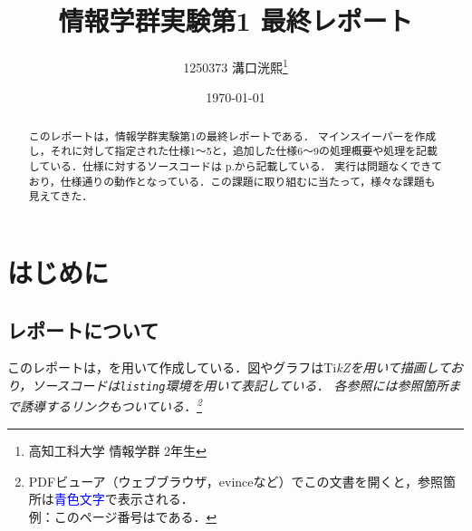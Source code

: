\documentclass[a4j,11pt]{jsarticle}
\title{\vspace{0cm}情報学群実験第1 最終レポート}
\author{1250373 溝口洸熙\thanks{高知工科大学 情報学群 2年生}}
\date{\today}
\begin{document}
\maketitle

\begin{abstract}
    このレポートは，情報学群実験第1の最終レポートである．
    マインスイーパーを作成し，それに対して指定された仕様1〜5と，追加した仕様6〜9の処理概要や処理を記載している．仕様に対するソースコードは p.\pageref{sec:ソースコード}から記載している．
    実行は問題なくできており，仕様通りの動作となっている．この課題に取り組むに当たって，様々な課題も見えてきた．
\end{abstract}
\newpage
\tableofcontents
\newpage
\section*{はじめに}\label{sec:はじめに}
\subsection*{レポートについて}
このレポートは，\LaTeXe を用いて作成している．図やグラフはTi\it{k}\normalfont Zを用いて描画しており，ソースコードは\verb|listing|環境を用いて表記している．
各参照には参照箇所まで誘導するリンクもついている．\footnote{PDFビューア（ウェブブラウザ，evinceなど）でこの文書を開くと，参照箇所は\textcolor{blue}{青色文字}で表示される．\\例：このページ番号は\pageref{sec:はじめに}である．}
\end{document}
